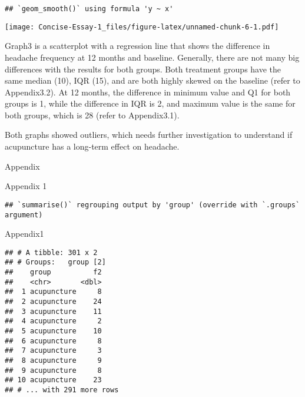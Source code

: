 \documentclass[
]{article}
\newenvironment{Shaded}{\begin{snugshade}}{\end{snugshade}}
\newcommand{\KeywordTok}[1]{\textcolor[rgb]{0.13,0.29,0.53}{\textbf{#1}}}
\newcommand{\NormalTok}[1]{#1}
\newcommand{\OperatorTok}[1]{\textcolor[rgb]{0.81,0.36,0.00}{\textbf{#1}}}
\newcommand{\StringTok}[1]{\textcolor[rgb]{0.31,0.60,0.02}{#1}}
\begin{document}
\begin{verbatim}
## `geom_smooth()` using formula 'y ~ x'
\end{verbatim}

\texttt{[image: Concise-Essay-1\_files/figure-latex/unnamed-chunk-6-1.pdf]}

Graph3 is a scatterplot with a regression line that shows the difference
in headache frequency at 12 months and baseline. Generally, there are
not many big differences with the results for both groups. Both
treatment groups have the same median (10), IQR (15), and are both
highly skewed on the baseline (refer to Appendix3.2). At 12 months, the
difference in minimum value and Q1 for both groups is 1, while the
difference in IQR is 2, and maximum value is the same for both groups,
which is 28 (refer to Appendix3.1).

Both graphs showed outliers, which needs further investigation to
understand if acupuncture has a long-term effect on headache.

Appendix

Appendix 1

\begin{Shaded}
\end{Shaded}

\begin{verbatim}
## `summarise()` regrouping output by 'group' (override with `.groups` argument)
\end{verbatim}

\begin{Shaded}
\begin{Highlighting}[]
\NormalTok{Appendix1}
\end{Highlighting}
\end{Shaded}

\begin{verbatim}
## # A tibble: 301 x 2
## # Groups:   group [2]
##    group          f2
##    <chr>       <dbl>
##  1 acupuncture     8
##  2 acupuncture    24
##  3 acupuncture    11
##  4 acupuncture     2
##  5 acupuncture    10
##  6 acupuncture     8
##  7 acupuncture     3
##  8 acupuncture     9
##  9 acupuncture     8
## 10 acupuncture    23
## # ... with 291 more rows
\end{verbatim}
\end{document}
